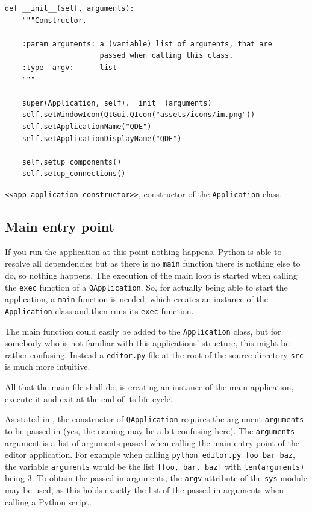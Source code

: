 \documentclass[10pt, openright, notitlepage]{scrreprt}
\begin{document}
\begin{listing}[H]
\begin{verbatim}
def __init__(self, arguments):
    """Constructor.

    :param arguments: a (variable) list of arguments, that are
                      passed when calling this class.
    :type  argv:      list
    """

    super(Application, self).__init__(arguments)
    self.setWindowIcon(QtGui.QIcon("assets/icons/im.png"))
    self.setApplicationName("QDE")
    self.setApplicationDisplayName("QDE")

    self.setup_components()
    self.setup_connections()
\end{verbatim}
\caption{\label{app-application-constructor}
\texttt{<<app-application-constructor>>}, constructor of the \texttt{Application} class.}
\end{listing}

\subsection{Main entry point}
\label{sec:org4f2ccc3}

If you run the application at this point nothing happens. Python is able to
resolve all dependencies but as there is no \texttt{main} function there is nothing
else to do, so nothing happens. The execution of the main loop is started when
calling the \texttt{exec} function of a \texttt{QApplication}. So, for actually being able to
start the application, a \texttt{main} function is needed, which creates an instance of
the \texttt{Application} class and then runs its \texttt{exec} function.

The main function could easily be added to the \texttt{Application} class, but for
somebody who is not familiar with this applications' structure, this might be
rather confusing. Instead a \texttt{editor.py} file at the root of the source directory
\texttt{src} is much more intuitive.

All that the main file shall do, is creating an instance of the main
application, execute it and exit at the end of its life cycle.

As stated in \label{Imports}, the constructor of \texttt{QApplication} requires the
argument \texttt{arguments} to be passed in (yes, the naming may be a bit confusing
here). The \texttt{arguments} argument is a list of arguments passed when calling the
main entry point of the editor application. For example when calling \texttt{python editor.py foo bar baz},
the variable \texttt{arguments} would be the list \texttt{[foo, bar, baz]} with
\texttt{len(arguments)} being 3. To obtain the passed-in arguments, the \texttt{argv}
attribute of the \texttt{sys} module may be used, as this holds exactly the list of the
passed-in arguments when calling a Python script.
\end{document}
